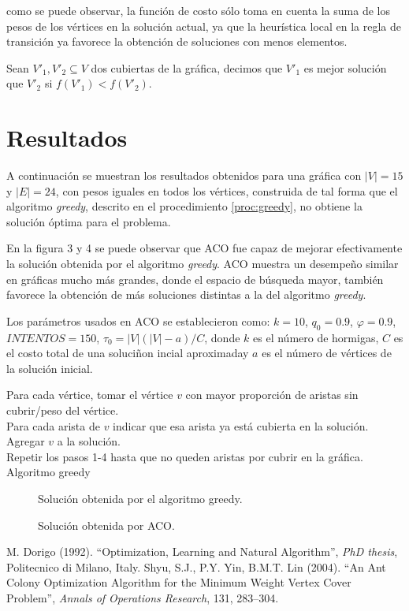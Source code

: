 \documentclass[12pt, letterpaper]{article}
\begin{document}
\noindent
como se puede observar, la función de costo sólo toma en cuenta la suma de los pesos de los vértices en la solución actual, ya que la heurística local en la regla de transición ya favorece la obtención de soluciones con menos elementos.
\par
Sean $V'_1, V'_2 \subseteq V$ dos cubiertas de la gráfica, decimos que $V'_1$ es mejor solución que $V'_2$ si $f(V'_1) < f(V'_2)$.

\section{Resultados}
A continuación se muestran los resultados obtenidos para una gráfica con $|V|=15$ y $|E|=24$, con pesos iguales en todos los vértices, construida de tal forma que el algoritmo \textit{greedy}, descrito en el procedimiento \ref{proc:greedy}, no obtiene la solución óptima para el problema.
\par
En la figura 3 y 4 se puede observar que ACO fue capaz de mejorar efectivamente la solución obtenida por el algoritmo \textit{greedy}. ACO muestra un desempeño similar en gráficas mucho más grandes, donde el espacio de búsqueda mayor, también favorece la obtención de más soluciones distintas a la del algoritmo \textit{greedy}.
\par
Los parámetros usados en ACO se establecieron como: $k = 10$, $q_0=0.9$,    $\varphi=0.9$, $INTENTOS=150$, $\tau_0 = |V|(|V|-a)/C$, donde $k$ es el número de hormigas, $C$ es el costo total de una soluciñon incial aproximaday $a$ es el número de vértices de la solución inicial.

\bigskip
\LinesNumbered
\begin{algorithm}[H]
Para cada vértice, tomar el vértice $v$ con mayor proporción de aristas sin cubrir/peso del vértice.\\
Para cada arista de $v$ indicar que esa arista ya está cubierta en la solución.\\
Agregar $v$ a la solución.\\
Repetir los pasos 1-4 hasta que no queden aristas por cubrir en la gráfica.\\
\caption{Algoritmo greedy}
\label{proc:greedy}
\end{algorithm}
\LinesNotNumbered
\bigskip

\begin{figure}[H]
  \centering
  
  \caption{Solución obtenida por el algoritmo greedy.}
  \label{fig:3}
\end{figure}

\begin{figure}[H]
  \centering
  
  \caption{Solución obtenida por ACO.}
  \label{fig:4}
\end{figure}

\begin{thebibliography}{2}
M. Dorigo (1992). ``Optimization, Learning and Natural Algorithm'', \textit{PhD thesis}, Politecnico di Milano, Italy.
Shyu, S.J., P.Y. Yin, B.M.T. Lin (2004). ``An Ant Colony Optimization Algorithm for the Minimum Weight Vertex Cover Problem'', \textit{Annals of Operations Research}, 131, 283–304.
\end{thebibliography}
\end{document}
